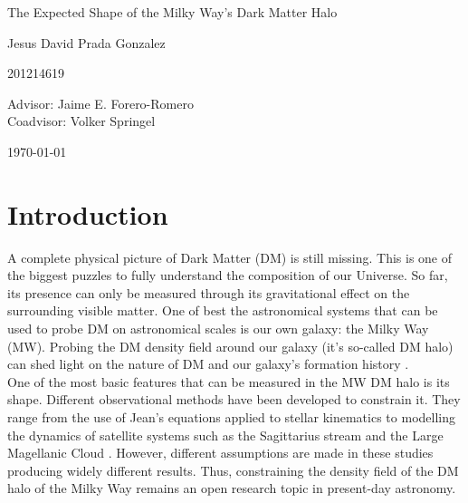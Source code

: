 \documentclass[12pt]{article}
\begin{document}
\begin{center}
\Huge
The Expected Shape of the Milky Way's Dark Matter Halo

\vspace{3mm}
\Large Jesus David Prada Gonzalez

\large
201214619


\vspace{2mm}
\Large
Advisor: Jaime E. Forero-Romero\\
Coadvisor: Volker Springel
\normalsize
\vspace{2mm}

\today
\end{center}


\normalsize
\section{Introduction}


A complete physical picture of Dark Matter (DM) is still missing.
This is one of the biggest puzzles to fully understand the composition of our Universe.
So far, its presence can only be measured through its gravitational effect on the surrounding visible matter. 
One of best the astronomical systems that can be used to probe DM on astronomical scales is our own galaxy: the Milky Way (MW).
Probing the DM density field around our galaxy (it's so-called DM halo) can shed light on the nature of DM \cite{Nipoti,ReadMoore} and our galaxy's formation history \cite{Read1,Read2,Vera-Ciro2011}.\\

One of the most basic features that can be measured in the MW DM halo is its shape. 
Different observational methods have been developed to constrain it. 
They range from the use of Jean's equations applied to stellar kinematics \cite{Loebman2012} to modelling the dynamics of satellite systems such as the Sagittarius stream and the Large Magellanic Cloud \cite{Vera-Ciro2013,Deg2012,LawMajewski2010}. 
However, different assumptions are made in these studies producing widely different results.
Thus, constraining the density field of the DM halo of the Milky Way remains an open research topic in present-day astronomy.\\ 
\end{document}
